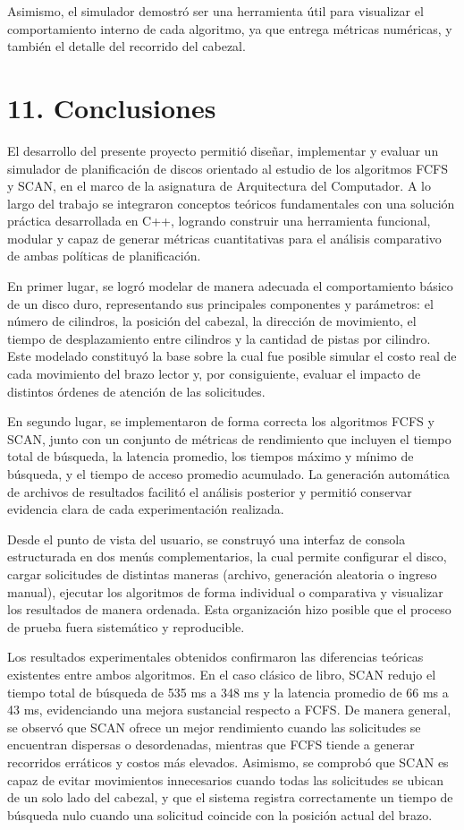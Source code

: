\documentclass[14pt,letterpaper]{extarticle}
\begin{document}
Asimismo, el simulador demostró ser una herramienta útil para visualizar el comportamiento interno de cada algoritmo, ya que entrega métricas numéricas, y también el detalle del recorrido del cabezal.

\vfill

\section*{11. Conclusiones}

El desarrollo del presente proyecto permitió diseñar, implementar y evaluar un simulador de planificación de discos orientado al estudio de los algoritmos FCFS y SCAN, en el marco de la asignatura de Arquitectura del Computador. A lo largo del trabajo se integraron conceptos teóricos fundamentales con una solución práctica desarrollada en C++, logrando construir una herramienta funcional, modular y capaz de generar métricas cuantitativas para el análisis comparativo de ambas políticas de planificación.

En primer lugar, se logró modelar de manera adecuada el comportamiento básico de un disco duro, representando sus principales componentes y parámetros: el número de cilindros, la posición del cabezal, la dirección de movimiento, el tiempo de desplazamiento entre cilindros y la cantidad de pistas por cilindro. Este modelado constituyó la base sobre la cual fue posible simular el costo real de cada movimiento del brazo lector y, por consiguiente, evaluar el impacto de distintos órdenes de atención de las solicitudes.

En segundo lugar, se implementaron de forma correcta los algoritmos FCFS y SCAN, junto con un conjunto de métricas de rendimiento que incluyen el tiempo total de búsqueda, la latencia promedio, los tiempos máximo y mínimo de búsqueda, y el tiempo de acceso promedio acumulado. La generación automática de archivos de resultados facilitó el análisis posterior y permitió conservar evidencia clara de cada experimentación realizada.

Desde el punto de vista del usuario, se construyó una interfaz de consola estructurada en dos menús complementarios, la cual permite configurar el disco, cargar solicitudes de distintas maneras (archivo, generación aleatoria o ingreso manual), ejecutar los algoritmos de forma individual o comparativa y visualizar los resultados de manera ordenada. Esta organización hizo posible que el proceso de prueba fuera sistemático y reproducible.

Los resultados experimentales obtenidos confirmaron las diferencias teóricas existentes entre ambos algoritmos. En el caso clásico de libro, SCAN redujo el tiempo total de búsqueda de 535 ms a 348 ms y la latencia promedio de 66 ms a 43 ms, evidenciando una mejora sustancial respecto a FCFS. De manera general, se observó que SCAN ofrece un mejor rendimiento cuando las solicitudes se encuentran dispersas o desordenadas, mientras que FCFS tiende a generar recorridos erráticos y costos más elevados. Asimismo, se comprobó que SCAN es capaz de evitar movimientos innecesarios cuando todas las solicitudes se ubican de un solo lado del cabezal, y que el sistema registra correctamente un tiempo de búsqueda nulo cuando una solicitud coincide con la posición actual del brazo.
\end{document}
